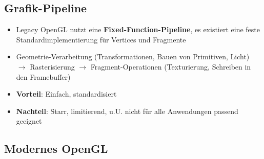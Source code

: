 \subsection{Grafik-Pipeline}%
\label{gl:sub:grafik_pipeline}

\begin{itemize}
	\item Legacy OpenGL nutzt eine \textbf{Fixed-Function-Pipeline}, es existiert eine feste Standardimplementierung für Vertices und Fragmente
	\item Geometrie-Verarbeitung (Transformationen, Bauen von Primitiven, Licht) $\rightarrow$ Rasterisierung $\rightarrow$ Fragment-Operationen (Texturierung, Schreiben in den Framebuffer)
	\item \textbf{Vorteil}: Einfach, standardisiert
	\item \textbf{Nachteil}: Starr, limitierend, u.U. nicht für alle Anwendungen passend geeignet
\end{itemize}

\subsection{Modernes OpenGL}%
\label{gl:sub:modernes_opengl}

